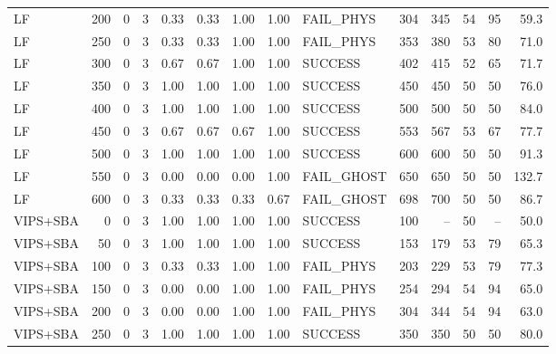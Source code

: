 \begin{tabular}{lrrr|rrrr|lrr|rr|r}
  LF                             &  200 &    0 &   3 & 0.33 & 0.33 & 1.00 & 1.00 & FAIL_PHYS       &   304 &   345 &    54 &    95 &  59.3 \\
  LF                             &  250 &    0 &   3 & 0.33 & 0.33 & 1.00 & 1.00 & FAIL_PHYS       &   353 &   380 &    53 &    80 &  71.0 \\
  LF                             &  300 &    0 &   3 & 0.67 & 0.67 & 1.00 & 1.00 & SUCCESS         &   402 &   415 &    52 &    65 &  71.7 \\
  LF                             &  350 &    0 &   3 & 1.00 & 1.00 & 1.00 & 1.00 & SUCCESS         &   450 &   450 &    50 &    50 &  76.0 \\
  LF                             &  400 &    0 &   3 & 1.00 & 1.00 & 1.00 & 1.00 & SUCCESS         &   500 &   500 &    50 &    50 &  84.0 \\
  LF                             &  450 &    0 &   3 & 0.67 & 0.67 & 0.67 & 1.00 & SUCCESS         &   553 &   567 &    53 &    67 &  77.7 \\
  LF                             &  500 &    0 &   3 & 1.00 & 1.00 & 1.00 & 1.00 & SUCCESS         &   600 &   600 &    50 &    50 &  91.3 \\
  LF                             &  550 &    0 &   3 & 0.00 & 0.00 & 0.00 & 1.00 & FAIL_GHOST      &   650 &   650 &    50 &    50 & 132.7 \\
  LF                             &  600 &    0 &   3 & 0.33 & 0.33 & 0.33 & 0.67 & FAIL_GHOST      &   698 &   700 &    50 &    50 &  86.7 \\
  VIPS+SBA                       &    0 &    0 &   3 & 1.00 & 1.00 & 1.00 & 1.00 & SUCCESS         &   100 &    -- &    50 &    -- &  50.0 \\
  VIPS+SBA                       &   50 &    0 &   3 & 1.00 & 1.00 & 1.00 & 1.00 & SUCCESS         &   153 &   179 &    53 &    79 &  65.3 \\
  VIPS+SBA                       &  100 &    0 &   3 & 0.33 & 0.33 & 1.00 & 1.00 & FAIL_PHYS       &   203 &   229 &    53 &    79 &  77.3 \\
  VIPS+SBA                       &  150 &    0 &   3 & 0.00 & 0.00 & 1.00 & 1.00 & FAIL_PHYS       &   254 &   294 &    54 &    94 &  65.0 \\
  VIPS+SBA                       &  200 &    0 &   3 & 0.00 & 0.00 & 1.00 & 1.00 & FAIL_PHYS       &   304 &   344 &    54 &    94 &  63.0 \\
  VIPS+SBA                       &  250 &    0 &   3 & 1.00 & 1.00 & 1.00 & 1.00 & SUCCESS         &   350 &   350 &    50 &    50 &  80.0 \\

\end{tabular}

